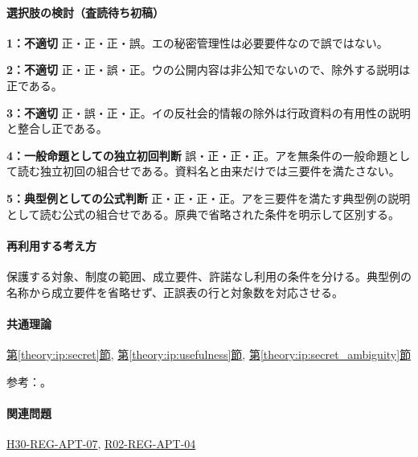 \paragraph{選択肢の検討（査読待ち初稿）}\mbox{}\par

\noindent\textbf{1：不適切} 正・正・正・誤。エの秘密管理性は必要要件なので誤ではない。\par

\noindent\textbf{2：不適切} 正・正・誤・正。ウの公開内容は非公知でないので、除外する説明は正である。\par

\noindent\textbf{3：不適切} 正・誤・正・正。イの反社会的情報の除外は行政資料の有用性の説明と整合し正である。\par

\noindent\textbf{4：一般命題としての独立初回判断} 誤・正・正・正。アを無条件の一般命題として読む独立初回の組合せである。資料名と由来だけでは三要件を満たさない。\par

\noindent\textbf{5：典型例としての公式判断} 正・正・正・正。アを三要件を満たす典型例の説明として読む公式の組合せである。原典で省略された条件を明示して区別する。\par

\paragraph{再利用する考え方} 保護する対象、制度の範囲、成立要件、許諾なし利用の条件を分ける。典型例の名称から成立要件を省略せず、正誤表の行と対象数を対応させる。

\paragraph{共通理論} \hyperref[theory:ip:secret]{第\ref*{theory:ip:secret}節}, \hyperref[theory:ip:usefulness]{第\ref*{theory:ip:usefulness}節}, \hyperref[theory:ip:secret_ambiguity]{第\ref*{theory:ip:secret_ambiguity}節}

\par 参考：\cite{ip_unfair_statute,ip_secret_handbook2017}。

\paragraph{関連問題} \hyperref[q:h30-reg-apt-07]{H30-REG-APT-07}, \hyperref[q:r02-reg-apt-04]{R02-REG-APT-04}

